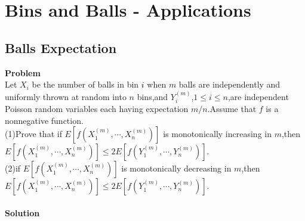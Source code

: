 \chapter{Bins and Balls - Applications}
	
	\section{Balls Expectation}
	\textbf{Problem}\\
	Let $X_i$ be the number of balls in bin $i$ when $m$ balls are independently and uniformly thrown at random into $n$ bins,and $Y^{(m)}_i$,$1 \leq i \leq n$,are independent Poisson random variables each having expectation $m/n$.Assume that $f$ is a nonnegative function.\\
	 (1)Prove that if $E[f(X^{(m)}_1,\cdots,X^{(m)}_n)]$ is monotonically increasing in $m$,then $E[f(X^{(m)}_1,\cdots,X^{(m)}_n)] \leq 2E[f(Y^{(m)}_1,\cdots,Y^{(m)}_n)]$.\\
	 (2)if $E[f(X^{(m)}_1,\cdots,X^{(m)}_n)]$ is monotonically decreasing in $m$,then $E[f(X^{(m)}_1,\cdots,X^{(m)}_n)] \leq 2E[f(Y^{(m)}_1,\cdots,Y^{(m)}_n)]$.\\\\
	\textbf{Solution}\\
